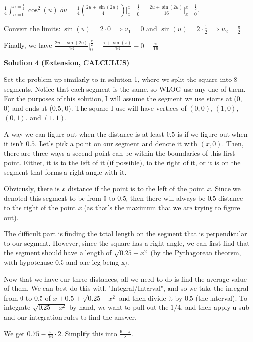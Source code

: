 \begin{enumerate}
 $\frac{1}{4}\int_{n=0}^{n=\frac{1}{2}}\cos^2(u)\;du= \frac{1}{4}(\frac{2u + \sin(2u)}{4})\Big|_{x=0}^{x=\frac{1}{2}}=\frac{2u+\sin(2u)}{16}\Big|_{x=0}^{x=\frac{1}{2}}$.

 Convert the limits: $\sin(u)=2\cdot0\implies u_1=0$ and $\sin(u)=2\cdot\frac{1}{2} \implies u_2=\frac{\pi}{2}$

 Finally, we have $\frac{2u+\sin(2u)}{16}\Big|_{0}^{\frac{\pi}{2}}=\frac{\pi+\sin(\pi)}{16}-0=\frac{\pi}{16}$




\textbf{Solution 4 (Extension, CALCULUS)}

Set the problem up similarly to in solution 1, where we split the square into 8 segments. Notice that each segment is the same, so WLOG use any one of them. For the purposes of this solution, I will assume the segment we use starts at (0, 0) and ends at (0.5, 0). The square I use will have vertices of $(0,0)$, $(1,0)$, $(0,1)$, and $(1,1)$. 

 A way we can figure out when the distance is at least $0.5$ is if we figure out when it isn't $0.5$. Let's pick a point on our segment and denote it with $(x, 0)$. Then, there are three ways a second point can be within the boundaries of this first point. Either, it is to the left of it (if possible), to the right of it, or it is on the segment that forms a right angle with it. 

 Obviously, there is $x$ distance if the point is to the left of the point $x$. Since we denoted this segment to be from $0$ to $0.5$, then there will always be $0.5$ distance to the right of the point $x$ (as that's the maximum that we are trying to figure out).

 The difficult part is finding the total length on the segment that is perpendicular to our segment. However, since the square has a right angle, we can first find that the segment should have a length of $\sqrt{0.25-x^2}$ (by the Pythagorean theorem, with hypotenuse 0.5 and one leg being x).

 Now that we have our three distances, all we need to do is find the average value of them. We can best do this with "Integral/Interval", and so we take the integral from $0$ to $0.5$ of $x+0.5+\sqrt{0.25-x^2}$ and then divide it by $0.5$ (the interval). To integrate $\sqrt{0.25-x^2}$ by hand, we want to pull out the $1/4$, and then apply u-sub and our integration rules to find the answer. 

 We get $0.75 - \frac{\pi}{16} \cdot 2$. Simplify this into $\frac{6-\pi}{8}$. 


\end{enumerate}
